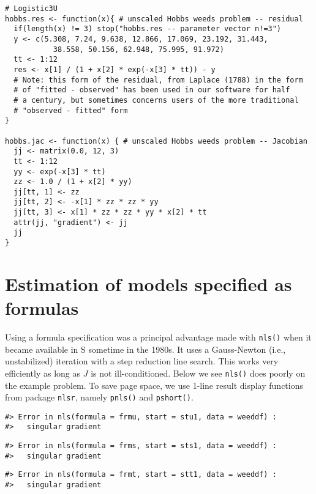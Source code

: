 \begin{verbatim}
# Logistic3U
hobbs.res <- function(x){ # unscaled Hobbs weeds problem -- residual
  if(length(x) != 3) stop("hobbs.res -- parameter vector n!=3")
  y <- c(5.308, 7.24, 9.638, 12.866, 17.069, 23.192, 31.443, 
           38.558, 50.156, 62.948, 75.995, 91.972)
  tt <- 1:12
  res <- x[1] / (1 + x[2] * exp(-x[3] * tt)) - y
  # Note: this form of the residual, from Laplace (1788) in the form
  # of "fitted - observed" has been used in our software for half
  # a century, but sometimes concerns users of the more traditional
  # "observed - fitted" form
}

hobbs.jac <- function(x) { # unscaled Hobbs weeds problem -- Jacobian
  jj <- matrix(0.0, 12, 3)
  tt <- 1:12
  yy <- exp(-x[3] * tt)
  zz <- 1.0 / (1 + x[2] * yy)
  jj[tt, 1] <- zz
  jj[tt, 2] <- -x[1] * zz * zz * yy
  jj[tt, 3] <- x[1] * zz * zz * yy * x[2] * tt
  attr(jj, "gradient") <- jj
  jj
}
\end{verbatim}

\hypertarget{estimation-of-models-specified-as-formulas}{%
\section{Estimation of models specified as formulas}\label{estimation-of-models-specified-as-formulas}}

Using a formula specification was a principal advantage made
with \texttt{nls()} when it became available in S sometime in the 1980s. It uses a
Gauss-Newton (i.e., unstabilized) iteration with a step reduction line
search. This works very efficiently as long as \(J\) is not ill-conditioned.
Below we see \texttt{nls()} does poorly on the example problem. To save page space,
we use 1-line result display functions from package \texttt{nlsr}, namely \texttt{pnls()}
and \texttt{pshort()}.

\begin{verbatim}
#> Error in nls(formula = frmu, start = stu1, data = weeddf) : 
#>   singular gradient
\end{verbatim}

\begin{verbatim}
#> Error in nls(formula = frms, start = sts1, data = weeddf) : 
#>   singular gradient
\end{verbatim}

\begin{verbatim}
#> Error in nls(formula = frmt, start = stt1, data = weeddf) : 
#>   singular gradient
\end{verbatim}

